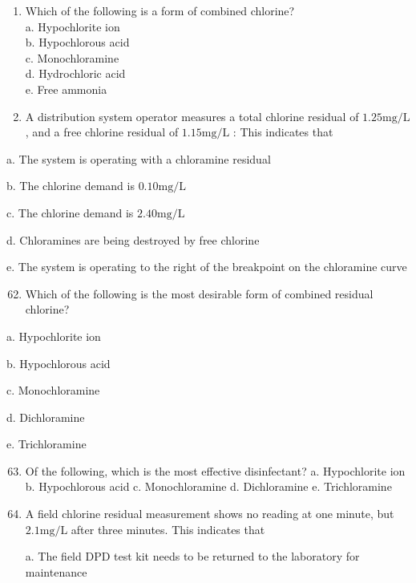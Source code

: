 \documentclass[10pt]{article}
\begin{document}
\begin{enumerate}
\begin{enumerate}
\begin{enumerate}
  \item Which of the following is a form of combined chlorine?\\
a. Hypochlorite ion\\
b. Hypochlorous acid\\
c. Monochloramine\\
d. Hydrochloric acid\\
e. Free ammonia

  \item A distribution system operator measures a total chlorine residual of $1.25 \mathrm{mg} / \mathrm{L}$, and a free chlorine residual of $1.15 \mathrm{mg} / \mathrm{L}$ : This indicates that

\end{enumerate}

a. The system is operating with a chloramine residual

b. The chlorine demand is $0.10 \mathrm{mg} / \mathrm{L}$

c. The chlorine demand is $2.40 \mathrm{mg} / \mathrm{L}$

d. Chloramines are being destroyed by free chlorine

e. The system is operating to the right of the breakpoint on the chloramine curve

\begin{enumerate}
  \setcounter{enumi}{61}
  \item Which of the following is the most desirable form of combined residual chlorine?
\end{enumerate}

a. Hypochlorite ion

b. Hypochlorous acid

c. Monochloramine

d. Dichloramine

e. Trichloramine

\begin{enumerate}
  \setcounter{enumi}{62}
  \item Of the following, which is the most effective disinfectant?
a. Hypochlorite ion
b. Hypochlorous acid
c. Monochloramine
d. Dichloramine
e. Trichloramine

  \item A field chlorine residual measurement shows no reading at one minute, but $2.1 \mathrm{mg} / \mathrm{L}$ after three minutes. This indicates that



a. The field DPD test kit needs to be returned to the laboratory for maintenance


\end{enumerate}
\end{enumerate}
\end{enumerate}
\end{document}
